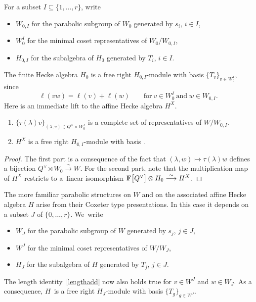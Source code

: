 For a subset $I\subseteq\{1,\dots,r\}$, write
\begin{itemize}\itemsep=0pt
\item $W_{0,I}$ for the parabolic subgroup of $W_0$ generated by $s_i$, $i\in I$,
\item $W_0^I$ for the minimal coset representatives of $W_0/W_{0,I}$,
\item $H_{0,I}$ for the subalgebra of $H_0$ generated by $T_i$, $i\in I$.
\end{itemize}
The finite Hecke algebra $H_0$ is a free right $H_{0,I}$-module with basis $\{T_v\}_{v\in W_0^I}$, since
\begin{equation}\label{lengthadd}
\ell(vw)=\ell(v)+\ell(w)\qquad \text{for}\ v\in W_0^I \ \text{and}\ w\in W_{0,I}.
\end{equation}
Here is an immediate lift to the affine Hecke algebra $H^X$.
\begin{Lemma}\label{lemfree}\hfill
\begin{enumerate}\itemsep=0pt
\item[$(1)$]
$\{\tau(\lambda)v\}_{(\lambda,v)\in Q^\vee\times W_0^I}$ is a complete set of representatives of $W/W_{0,I}$.
\item[$(2)$] $H^X$ is a free right $H_{0,I}$-module with
basis .
\end{enumerate}
\end{Lemma}
\begin{proof}
The first part is a consequence of the fact that $(\lambda,w)\mapsto \tau(\lambda)w$ defines a bijection $Q^\vee\rtimes W_0\overset{\sim}{\longrightarrow} W$. For the second part, note that the multiplication map of $H^X$ restricts to
a~linear isomorphism $\mathbf{F}\smash{\bigl[Q^\vee\bigr]}\otimes H_0\overset{\sim}{\longrightarrow} H^X$.
\end{proof}

The more familiar parabolic structures on $W$ and on the associated affine Hecke algebra $H$ arise from their Coxeter type presentations. In this case it depends on a subset $J$ of $\{0,\dots,r\}$. We~write
\begin{itemize}\itemsep=0pt
\item $W_{J}$ for the parabolic subgroup of $W$ generated by $s_j$, $j\in J$,
\item $W^J$ for the minimal coset representatives of $W/W_{J}$,
\item $H_{J}$ for the subalgebra of $H$ generated by $T_j$, $j\in J$.
\end{itemize}
The length identity~\eqref{lengthadd} now also holds true for $v\in W^J$ and $w\in W_J$. As a consequence, $H$~is a free right $H_J$-module with basis
$\{T_g\}_{g\in W^J}$.


